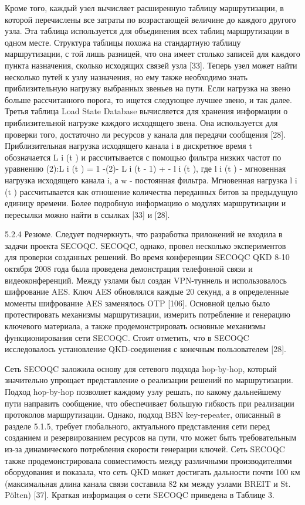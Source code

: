 Кроме того, каждый узел вычисляет расширенную таблицу маршрутизации, в которой перечислены все затраты по возрастающей величине до каждого другого узла. Эта таблица используется для объединения всех таблиц маршрутизации в одном месте. Структура таблицы похожа на стандартную таблицу маршрутизации, с той лишь разницей, что она имеет столько записей для каждого пункта назначения, сколько исходящих связей узла [33]. Теперь узел может найти несколько путей к узлу назначения, но ему также необходимо знать приблизительную нагрузку выбранных звеньев на пути. Если нагрузка на звено больше рассчитанного порога, то ищется следующее лучшее звено, и так далее. Третья таблица Load State Database вычисляется для хранения информации о приблизительной нагрузке каждого исходящего звена. Она используется для проверки того, достаточно ли ресурсов у канала для передачи сообщения [28]. Приблизительная нагрузка исходящего канала i в дискретное время t обозначается L i (t ) и рассчитывается с помощью фильтра низких частот по уравнению (2):L i (t ) = 1 -(2)- L i (t - 1) + - l i (t ), где l i (t ) - мгновенная нагрузка исходящего канала i, а w - постоянная фильтра. Мгновенная нагрузка l i (t ) рассчитывается как отношение количества переданных битов за предыдущую единицу времени. Более подробную информацию о модулях маршрутизации и пересылки можно найти в ссылках [33] и [28].


5.2.4 Резюме. Следует подчеркнуть, что разработка приложений не входила в задачи проекта SECOQC. SECOQC, однако, провел несколько экспериментов для проверки созданных решений. Во время конференции SECOQC QKD 8-10 октября 2008 года была проведена демонстрация телефонной связи и видеоконференций. Между узлами был создан VPN-туннель и использовалось шифрование AES. Ключ AES обновлялся каждые 20 секунд, а в определенные моменты шифрование AES заменялось OTP [106]. Основной целью было протестировать механизмы маршрутизации, измерить потребление и генерацию ключевого материала, а также продемонстрировать основные механизмы функционирования сети SECOQC. Стоит отметить, что в SECOQC исследовалось установление QKD-соединения с конечным пользователем [28].

Сеть SECOQC заложила основу для сетевого подхода hop-by-hop, который значительно упрощает представление о реализации решений по маршрутизации. Подход hop-by-hop позволяет каждому узлу решать, по какому дальнейшему пути направить сообщение, что обеспечивает большую гибкость при реализации протоколов маршрутизации. Однако, подход BBN key-repeater, описанный в разделе 5.1.5, требует глобального, актуального представления сети перед созданием и резервированием ресурсов на пути, что может быть требовательным из-за динамического потребления скорости генерации ключей. Сеть SECOQC также продемонстрировала совместимость между различными производителями оборудования и показала, что сеть QKD может достигать дальности почти 100 км (максимальная длина канала связи составила 82 км между узлами BREIT и St. Pölten) [37]. Краткая информация о сети SECOQC приведена в Таблице 3.

